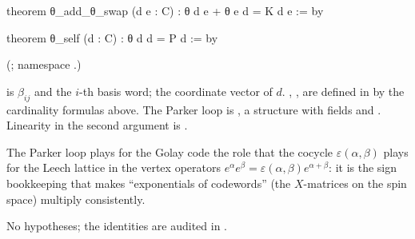 \begin{leancode}
theorem θ_add_θ_swap (d e : C) : θ d e + θ e d = K d e := by
\end{leancode}
\begin{leancode}
theorem θ_self (d : C) : θ d d = P d := by
\end{leancode}
(;
namespace .)
\begin{dictionary}
 is $\beta_{ij}$ and  the $i$-th basis word;  the coordinate
vector of $d$.  , ,  are defined in  by the cardinality
formulas above.  The Parker loop is , a structure with fields  and
.  Linearity in the second argument is .
\end{dictionary}
\begin{physics}
The Parker loop plays for the Golay code the role that the cocycle $\varepsilon(\alpha,\beta)$ plays
for the Leech lattice in the vertex operators $e^\alpha e^\beta=\varepsilon(\alpha,\beta)e^{\alpha+\beta}$:
it is the sign bookkeeping that makes ``exponentials of codewords'' (the $X$-matrices on the spin
space) multiply consistently.
\end{physics}
\begin{status}
No hypotheses; the identities are audited in .
\end{status}

